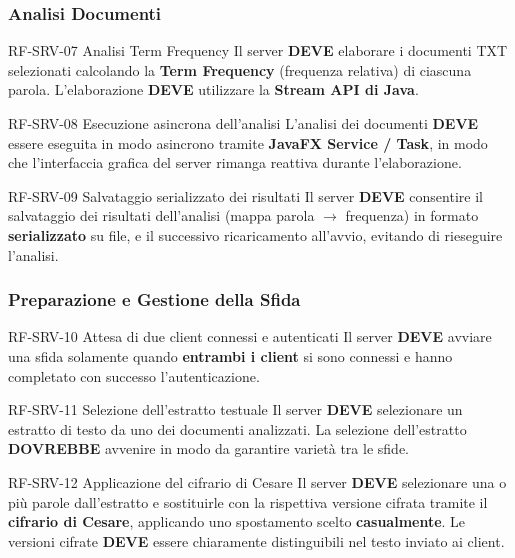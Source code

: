 \documentclass[12pt, a4paper]{article}
\newcommand{\mustshall}{\textbf{DEVE}}
\newcommand{\should}{\textbf{DOVREBBE}}
\begin{document}
\subsubsection{Analisi Documenti}

\begin{reqbox}{RF-SRV-07 \quad Analisi Term Frequency \quad [MUST]}
Il server \mustshall{} elaborare i documenti TXT selezionati calcolando la \textbf{Term Frequency} (frequenza relativa) di ciascuna parola. L'elaborazione \mustshall{} utilizzare la \textbf{Stream API di Java}.
\end{reqbox}

\begin{reqbox}{RF-SRV-08 \quad Esecuzione asincrona dell'analisi \quad [MUST]}
L'analisi dei documenti \mustshall{} essere eseguita in modo asincrono tramite \textbf{JavaFX Service / Task}, in modo che l'interfaccia grafica del server rimanga reattiva durante l'elaborazione.
\end{reqbox}

\begin{reqbox}{RF-SRV-09 \quad Salvataggio serializzato dei risultati \quad [MUST]}
Il server \mustshall{} consentire il salvataggio dei risultati dell'analisi (mappa parola $\rightarrow$ frequenza) in formato \textbf{serializzato} su file, e il successivo ricaricamento all'avvio, evitando di rieseguire l'analisi.
\end{reqbox}

\subsubsection{Preparazione e Gestione della Sfida}

\begin{reqbox}{RF-SRV-10 \quad Attesa di due client connessi e autenticati \quad [MUST]}
Il server \mustshall{} avviare una sfida solamente quando \textbf{entrambi i client} si sono connessi e hanno completato con successo l'autenticazione.
\end{reqbox}

\begin{reqbox}{RF-SRV-11 \quad Selezione dell'estratto testuale \quad [MUST]}
Il server \mustshall{} selezionare un estratto di testo da uno dei documenti analizzati. La selezione dell'estratto \should{} avvenire in modo da garantire varietà tra le sfide.
\end{reqbox}

\begin{reqbox}{RF-SRV-12 \quad Applicazione del cifrario di Cesare \quad [MUST]}
Il server \mustshall{} selezionare una o più parole dall'estratto e sostituirle con la rispettiva versione cifrata tramite il \textbf{cifrario di Cesare}, applicando uno spostamento scelto \textbf{casualmente}. Le versioni cifrate \mustshall{} essere chiaramente distinguibili nel testo inviato ai client.
\end{reqbox}
\end{document}
